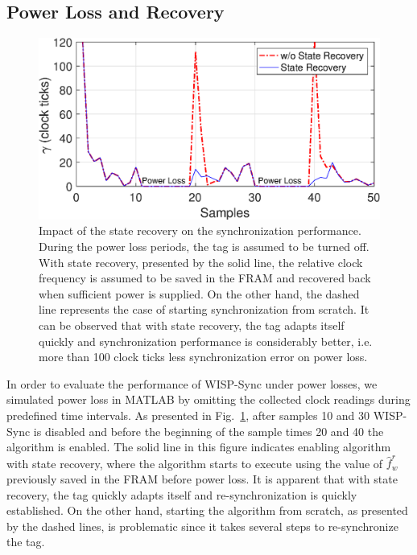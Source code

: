 \documentclass[10pt,journal,compsoc]{IEEEtran}
\begin{document}
\subsection{Power Loss and Recovery}

\begin{figure}
	\centering
	\includegraphics[width=0.85\columnwidth]{figures/power_loss.eps}
	\caption{\label{fig:power_loss}Impact of the state recovery on the synchronization performance. During the power loss periods, the tag is assumed to be turned off. With state recovery, presented by the solid line, the relative clock frequency is assumed to be saved in the FRAM and recovered back when sufficient power is supplied. On the other hand, the dashed line represents the case of starting synchronization from scratch. It can be observed that with state recovery, the tag adapts itself quickly and synchronization performance is considerably better, i.e. more than 100 clock ticks less synchronization error on power loss.} 
\end{figure}

In order to evaluate the performance of WISP-Sync under power losses, we simulated power loss in MATLAB by omitting the collected clock readings during predefined time intervals. As presented in Fig.~\ref{fig:power_loss}, after samples 10 and 30 WISP-Sync is disabled and before the beginning of the sample times 20 and 40 the algorithm is enabled. The solid line in this figure indicates enabling algorithm with state recovery, where the algorithm starts to execute using the value of $\hat{f}_w^r$  previously saved in the FRAM before power loss. It is apparent that with state recovery, the tag quickly adapts itself and re-synchronization is quickly established. On the other hand, starting the algorithm from scratch, as presented by the dashed lines, is problematic since it takes several steps to re-synchronize the tag.
%
%		
%
\end{document}
